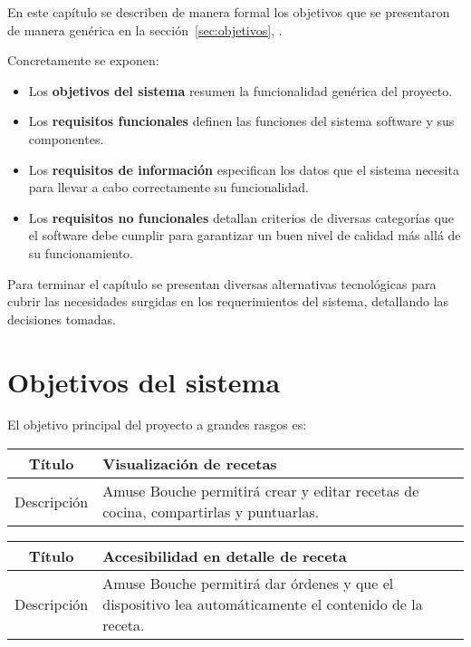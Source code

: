 
En este capítulo se describen de manera formal los objetivos que se presentaron
de manera genérica en la sección~\ref{sec:objetivos},
\textit{}. 

Concretamente se exponen:

\begin{itemize}
\item Los \textbf{objetivos del sistema} resumen la funcionalidad genérica del
 proyecto.
\item Los \textbf{requisitos funcionales} definen las funciones del sistema
  software y sus componentes.
\item Los \textbf{requisitos de información} especifican los datos que el
  sistema necesita para llevar a cabo correctamente su funcionalidad.
\item Los \textbf{requisitos no funcionales} detallan criterios de diversas
  categorías que el software debe cumplir para garantizar un buen nivel de
  calidad más allá de su funcionamiento.
\end{itemize}

Para terminar el capítulo se presentan diversas alternativas tecnológicas para
cubrir las necesidades surgidas en los requerimientos del sistema, detallando
las decisiones tomadas.


\section{Objetivos del sistema}

El objetivo principal del proyecto a grandes rasgos es:

\begin{center}
  
  \begin{tabularx}{\textwidth}{|c|X|}
    \hline
    Título & Visualización de recetas \\

    \hline

    Descripción & Amuse Bouche permitirá crear y editar recetas de cocina,
    compartirlas y puntuarlas.\\

    \hline
  \end{tabularx}
\end{center}

\begin{center}
  
  \begin{tabularx}{\textwidth}{|c|X|}
    \hline
    Título & Accesibilidad en detalle de receta \\

    \hline

    Descripción & Amuse Bouche permitirá dar órdenes y que el dispositivo
    lea automáticamente el contenido de la receta.\\

    \hline
  \end{tabularx}
\end{center}

